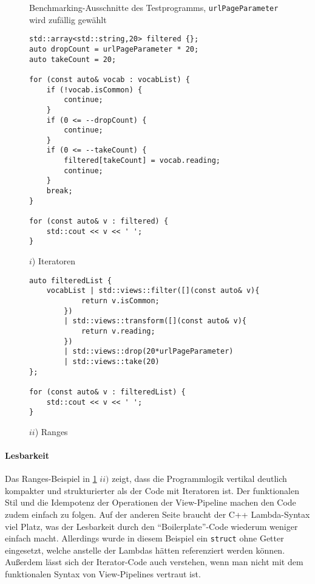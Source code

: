 \documentclass[runningheads]{llncs}
\begin{document}
\begin{figure}
	\caption{Benchmarking-Ausschnitte des Testprogramms, \texttt{urlPageParameter} wird zufällig gewählt}
	\label{code:benchmark-ranges}
	\begin{minipage}{0.475\textwidth}
		\begin{lstlisting}[basicstyle={\ttfamily\tiny}]
std::array<std::string,20> filtered {};
auto dropCount = urlPageParameter * 20;
auto takeCount = 20;

for (const auto& vocab : vocabList) {
    if (!vocab.isCommon) {
        continue;
    }
    if (0 <= --dropCount) {
        continue;
    }
    if (0 <= --takeCount) {
        filtered[takeCount] = vocab.reading;
        continue;
    }
    break;
}

for (const auto& v : filtered) {
    std::cout << v << ' ';
} \end{lstlisting}
		\caption*{$i$) Iteratoren}
	\end{minipage}
	\begin{minipage}{0.475\textwidth}
		\begin{lstlisting}[basicstyle={\ttfamily\tiny}]
auto filteredList {
    vocabList | std::views::filter([](const auto& v){
			return v.isCommon;
		})
        | std::views::transform([](const auto& v){
			return v.reading;
		})
        | std::views::drop(20*urlPageParameter)
        | std::views::take(20)
};

for (const auto& v : filteredList) {
    std::cout << v << ' ';
}
\end{lstlisting}
		\caption*{$ii$) Ranges}
	\end{minipage}
\end{figure}

\paragraph{Lesbarkeit}
Das Ranges-Beispiel in \ref{code:benchmark-ranges} $ii)$ zeigt, dass die Programmlogik vertikal deutlich kompakter und strukturierter als der Code mit Iteratoren ist.
Der funktionalen Stil und die Idempotenz der Operationen der View-Pipeline machen den Code zudem einfach zu folgen.
Auf der anderen Seite braucht der C++ Lambda-Syntax viel Platz, was der Lesbarkeit durch den \enquote{Boilerplate}-Code wiederum weniger einfach macht.
Allerdings wurde in diesem Beispiel ein \texttt{struct} ohne Getter eingesetzt, welche anstelle der Lambdas hätten referenziert werden können.
Außerdem lässt sich der Iterator-Code auch verstehen, wenn man nicht mit dem funktionalen Syntax von View-Pipelines vertraut ist.
\end{document}
